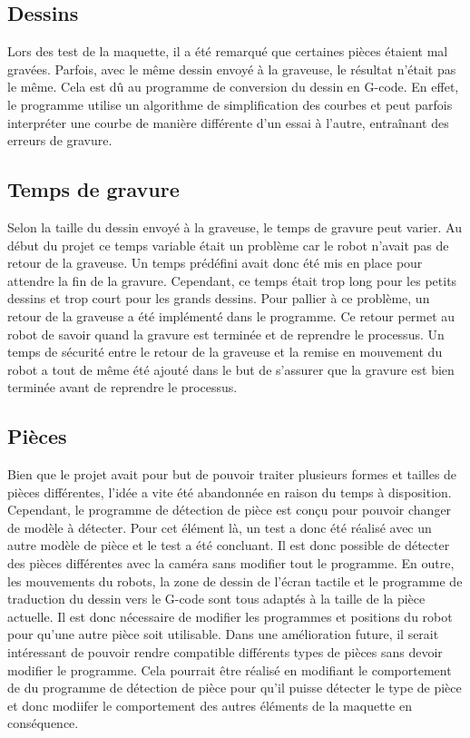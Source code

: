 \subsection{Dessins}
Lors des test de la maquette, il a été remarqué que certaines pièces étaient mal gravées. Parfois, avec le même dessin envoyé à la graveuse, le résultat n'était pas le même. Cela est dû au programme de conversion du dessin en G-code. En effet, le programme utilise un algorithme de simplification des courbes et peut parfois interpréter une courbe de manière différente d'un essai à l'autre, entraînant des erreurs de gravure.

\subsection{Temps de gravure}
Selon la taille du dessin envoyé à la graveuse, le temps de gravure peut varier. Au début du projet ce temps variable était un problème car le robot n'avait pas de retour de la graveuse. Un temps prédéfini avait donc été mis en place pour attendre la fin de la gravure. Cependant, ce temps était trop long pour les petits dessins et trop court pour les grands dessins. Pour pallier à ce problème, un retour de la graveuse a été implémenté dans le programme. Ce retour permet au robot de savoir quand la gravure est terminée et de reprendre le processus. Un temps de sécurité entre le retour de la graveuse et la remise en mouvement du robot a tout de même été ajouté dans le but de s'assurer que la gravure est bien terminée avant de reprendre le processus.

\subsection{Pièces}
Bien que le projet avait pour but de pouvoir traiter plusieurs formes et tailles de pièces différentes, l'idée a vite été abandonnée en raison du temps à disposition. Cependant, le programme de détection de pièce est conçu pour pouvoir changer de modèle à détecter. Pour cet élément là, un test a donc été réalisé avec un autre modèle de pièce et le test a été concluant. Il est donc possible de détecter des pièces différentes avec la caméra sans modifier tout le programme. En outre, les mouvements du robots, la zone de dessin de l'écran tactile et le programme de traduction du dessin vers le G-code sont tous adaptés à la taille de la pièce actuelle. Il est donc nécessaire de modifier les programmes et positions du robot pour qu'une autre pièce soit utilisable. Dans une amélioration future, il serait intéressant de pouvoir rendre compatible différents types de pièces sans devoir modifier le programme. Cela pourrait être réalisé en modifiant le comportement de du programme de détection de pièce pour qu'il puisse détecter le type de pièce et donc modiifer le comportement des autres éléments de la maquette en conséquence.

